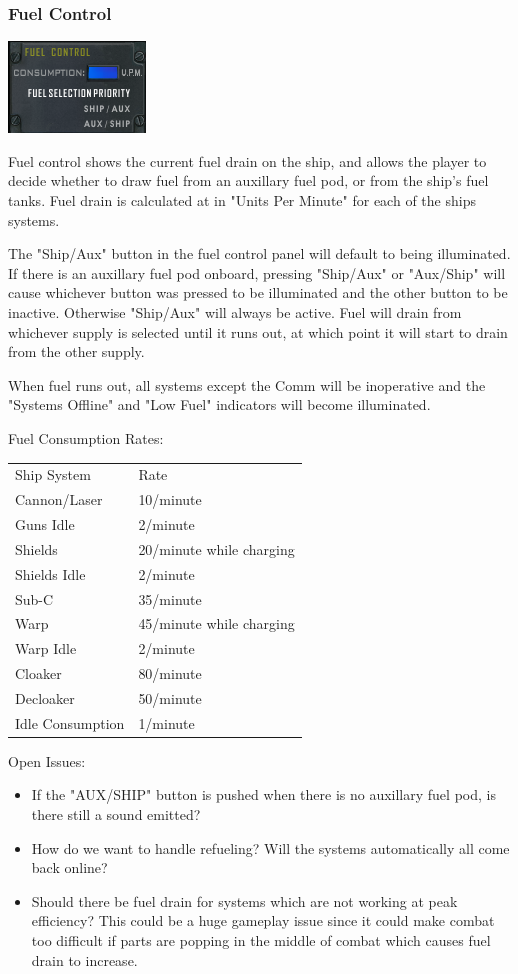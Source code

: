 \subsubsection{Fuel Control}
\includegraphics[scale=0.70]{images/fuelcontrol.png}

Fuel control shows the current fuel drain on the ship, and allows the player
to decide whether to draw fuel from an auxillary fuel pod, or from the
ship's fuel tanks.  Fuel drain is calculated at in "Units Per Minute" for
each of the ships systems.

The "Ship\slash Aux" button in the fuel control panel will default to
being illuminated.  If there is an auxillary fuel pod onboard, pressing
"Ship\slash Aux" or "Aux\slash Ship" will cause whichever button was
pressed to be illuminated and the other button to be inactive.  Otherwise
"Ship\slash Aux" will always be active.  Fuel will drain from whichever
supply is selected until it runs out, at which point it will start to drain
from the other supply.  

When fuel runs out, all systems except the Comm will be inoperative and
the "Systems Offline" and "Low Fuel" indicators will become illuminated.

Fuel Consumption Rates:

\begin{tabular}{ | l | l | }
\hline
Ship System & Rate \\
Cannon\slash Laser & 10\slash minute \\
Guns Idle & 2\slash minute \\
Shields & 20\slash minute while charging \\
Shields Idle & 2\slash minute \\
Sub-C & 35\slash minute \\
Warp & 45\slash minute while charging \\
Warp Idle & 2\slash minute \\
Cloaker & 80\slash minute \\
Decloaker & 50\slash minute \\
Idle Consumption & 1\slash minute \\
\hline
\end{tabular}

Open Issues:
\begin{itemize}
\item If the "AUX\slash SHIP" button is pushed when there is no auxillary
fuel pod, is there still a sound emitted?
\item How do we want to handle refueling?  Will the systems automatically
all come back online?
\item Should there be fuel drain for systems which are not working at
peak efficiency?  This could be a huge gameplay issue since it could make
combat too difficult if parts are popping in the middle of combat which
causes fuel drain to increase.
\end{itemize}

